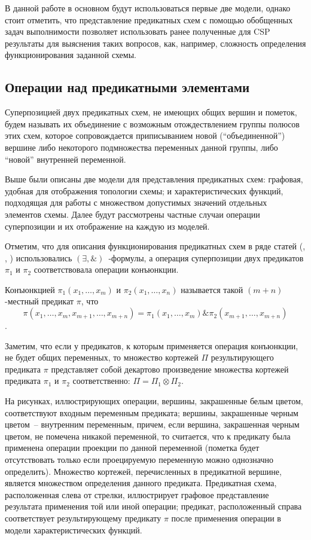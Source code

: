 \documentclass[12pt]{extarticle}
\newenvironment{definition}[1][Определение.]{\begin{trivlist}
\item[\hskip \labelsep {\bfseries #1}]}{\end{trivlist}}
\begin{document}
В данной работе в основном будут использоваться первые две модели, однако стоит отметить, что представление предикатных
схем с помощью обобщенных задач выполнимости позволяет использовать ранее полученные для CSP результаты для 
выяснения таких вопросов, как, например, сложность определения функционирования заданной схемы.

\subsection{Операции над предикатными элементами}

\begin{definition}
Суперпозицией двух предикатных схем, не имеющих общих вершин и пометок, 
будем называть их объединение с возможным отождествлением группы полюсов этих схем, 
которое сопровождается приписыванием новой (``объединенной'') вершине либо 
некоторого подмножества переменных данной группы, либо ``новой'' внутренней переменной.
\end{definition}

Выше были описаны две модели для представления предикатных схем: графовая, удобная для отображения топологии схемы; 
и характеристических функций, подходящая для работы с множеством допустимых значений отдельных элементов схемы. Далее 
будут рассмотрены частные случаи операции суперпозиции и их отображение на каждую из моделей.

Отметим, что для описания функционирования предикатных схем в ряде статей (\cite{Marchenkov}, \cite{Zhuk}, \cite{Shu09})
использовались $(\exists, \&)$~-формулы, а операция суперпозиции двух предикатов $\pi_1$ и $\pi_2$ соответствовала
операции конъюнкции.

\begin{definition}
Конъюнкцией $\pi_1(x_1, \dots, x_m)$ и $\pi_2(x_1, \dots, x_n)$ называется такой $(m+n)$-местный предикат $\pi$, что
$$\pi(x_1, \dots, x_m, x_{m+1}, \dots, x_{m+n}) = \pi_1(x_1, \dots, x_m) \& \pi_2(x_{m+1}, \dots, x_{m+n})$$.
\end{definition}

Заметим, что если у предикатов, к которым применяется операция конъюнкции,
не будет общих переменных, то множество кортежей $\Pi$ результирующего предиката 
$\pi$ представляет собой декартово произведение множества кортежей предиката $\pi_1$ и $\pi_2$ соответственно:
$\Pi = \Pi_1 \otimes \Pi_2$.

На рисунках, иллюстрирующих операции, вершины, закрашенные белым цветом, соответствуют входным переменным предиката; 
вершины, закрашенные черным цветом~-- внутренним переменным, причем, если вершина, закрашенная черным цветом, 
не помечена никакой переменной, то считается, что к предикату была применена операции 
проекции по данной переменной (пометка будет отсутствовать только если проецируемую переменную можно однозначно определить).
Множество кортежей, перечисленных в предикатной вершине, является множеством определения данного предиката. 
Предикатная схема, расположенная слева от стрелки, иллюстрирует графовое представление результата применения той или иной
операции; предикат, расположенный справа соответствует результирующему предикату $\pi$ после применения операции 
в модели характеристических функций.
\end{document}

